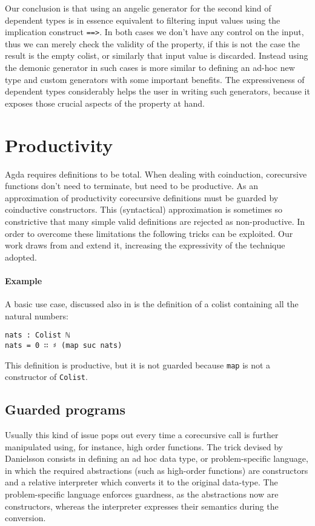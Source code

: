 \documentclass[10pt,a4paper]{article}
\begin{document}
Our conclusion is that using an angelic generator for the second kind of dependent types is in essence equivalent to filtering input values using the implication construct \texttt{==>}. In both cases we don't have any control on the input, thus we can merely check the validity of the property, if this is not the case the result is the empty colist, or similarly that input value is discarded.
Instead using the demonic generator in such cases is more similar to defining an ad-hoc new type and custom generators with some important benefits.
The expressiveness of dependent types considerably helps the user in writing such generators, because it exposes those crucial aspects of the property at hand.

\section{Productivity}
\label{sec:Productivity}
Agda requires definitions to be total. When dealing with coinduction, corecursive functions don't need to terminate, but need to be productive.
As an approximation of productivity corecursive definitions must be guarded by coinductive constructors. This (syntactical) approximation is sometimes so constrictive that many simple valid definitions are rejected as non-productive. In order to overcome these limitations the following tricks can be exploited. Our work draws from \cite{DAN10} and extend it, increasing 
the expressivity of the technique adopted.

\paragraph{Example}
A basic use case, discussed also in \cite{DAN10} is the definition of a colist
containing all the natural numbers:
\begin{verbatim}
nats : Colist ℕ
nats = 0 ∷ ♯ (map suc nats)
\end{verbatim}
This definition is productive, but it is not guarded because \texttt{map} is not a constructor of \texttt{Colist}. 

\subsection{Guarded programs}
Usually this kind of issue pops out every time a corecursive call is further manipulated using, for instance, high order functions.
The trick devised by Danielsson consists in defining an ad hoc data type, or problem-specific language, in which the required abstractions (such as high-order functions) are constructors and a relative interpreter which converts it to the original data-type.
The problem-specific language enforces guardness, as the abstractions now are constructors, whereas the interpreter expresses their semantics during the conversion.
\end{document}
